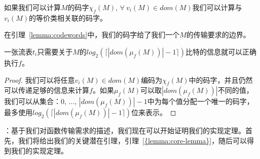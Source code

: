 \begin{definition} 如果我们可以计算$M$的码字$\chi_f(M)$, $\forall\ v_i(M) \in dom(M)$我们可以计算与$v_i(M)$的等价类相关联的码字。
\end{definition}

在引理~\ref{lemma:codewords}中，我们的码字给了我们一个$M$的传输要求的边界。

\begin{lemma} 
\label{lemma:codewords}
一张流表$t_i$只需要关于$M$的$log_2(\lceil |dom(\mu_f(M))|-1 \rceil)$比特的信息就可以正确执行$f$。
\end{lemma}

\begin{proof}
我们可以将任意$v_i(M) \in dom(M)$编码为$\chi_f(M)$中的码字，并且仍然可以传递足够的信息来计算$f$。如果$\mu_f(M)$可以取$|dom(\mu_f(M))|$不同的值，我们可以从集合：$0$, $...$, $|dom(\mu_f(M))|-1$中为每个值分配一个唯一的码字，最多使用$log_2(\lceil |dom(\mu_f(M))|-1 \rceil)$位来表示。
\end{proof}

：基于我们对函数传输需求的描述，我们现在可以开始证明我们的实现定理。首先，我们将给出我们的关键潜在引理，引理~\ref{{lemma:core-lemma}}，随后可以得到我们的实现定理。

